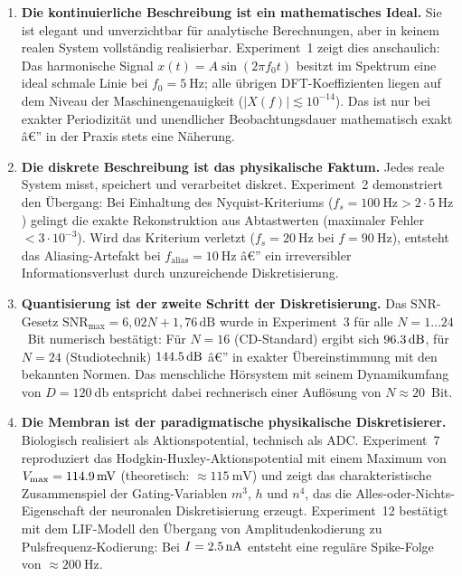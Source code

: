 ﻿\documentclass[12pt,a4paper,titlepage]{report}
\begin{document}
\begin{enumerate}[leftmargin=2em, label=\textbf{\arabic{enumi}.}]

	\item \textbf{Die kontinuierliche Beschreibung ist ein mathematisches Ideal.}
		Sie ist elegant und unverzichtbar für analytische Berechnungen,
		aber in keinem realen System vollständig realisierbar.
		Experiment~1 zeigt dies anschaulich: Das harmonische Signal
		$x(t)=A\sin(2\pi f_0 t)$ besitzt im Spektrum eine ideal schmale
		Linie bei $f_0=\SI{5}{\hertz}$; alle übrigen DFT-Koeffizienten
		liegen auf dem Niveau der Maschinengenauigkeit
		($|X(f)| \lesssim 10^{-14}$).
		Das ist nur bei exakter Periodizität und unendlicher Beobachtungsdauer
		mathematisch exakt â€” in der Praxis stets eine Näherung.

	\item \textbf{Die diskrete Beschreibung ist das physikalische Faktum.}
		Jedes reale System misst, speichert und verarbeitet diskret.
		Experiment~2 demonstriert den Übergang: Bei Einhaltung des
		Nyquist-Kriteriums ($f_s=\SI{100}{\hertz} > 2\cdot\SI{5}{\hertz}$)
		gelingt die exakte Rekonstruktion aus Abtastwerten
		(maximaler Fehler $< 3\cdot10^{-3}$).
		Wird das Kriterium verletzt ($f_s=\SI{20}{\hertz}$ bei
		$f=\SI{90}{\hertz}$), entsteht das Aliasing-Artefakt bei
		$f_{\mathrm{alias}}=\SI{10}{\hertz}$ â€” ein irreversibler
		Informationsverlust durch unzureichende Diskretisierung.

	\item \textbf{Quantisierung ist der zweite Schritt der Diskretisierung.}
		Das $\mathrm{SNR}$-Gesetz $\mathrm{SNR}_{\max}=6{,}02N+1{,}76\,\mathrm{dB}$
		wurde in Experiment~3 für alle $N=1\ldots24$~Bit numerisch bestätigt:
		Für $N=16$ (CD-Standard) ergibt sich $\SI{96{,}3}{\decibel}$,
		für $N=24$ (Studiotechnik) $\SI{144{,}5}{\decibel}$ â€”
		in exakter Übereinstimmung mit den bekannten Normen.
		Das menschliche Hörsystem mit seinem Dynamikumfang von
		$D=\SI{120}{\decibel}$ entspricht dabei rechnerisch
		einer Auflösung von $N\approx20$~Bit.

	\item \textbf{Die Membran ist der paradigmatische physikalische Diskretisierer.}
		Biologisch realisiert als Aktionspotential, technisch als ADC.
		Experiment~7 reproduziert das Hodgkin-Huxley-Aktionspotential
		mit einem Maximum von $V_{\max}=\SI{114{,}9}{\milli\volt}$
		(theoretisch: $\approx\SI{115}{\milli\volt}$) und zeigt das
		charakteristische Zusammenspiel der Gating-Variablen $m^3$, $h$ und $n^4$,
		das die Alles-oder-Nichts-Eigenschaft der neuronalen Diskretisierung erzeugt.
		Experiment~12 bestätigt mit dem LIF-Modell den Übergang von
		Amplitudenkodierung zu Pulsfrequenz-Kodierung:
		Bei $I=\SI{2{,}5}{\nano\ampere}$ entsteht eine reguläre
		Spike-Folge von $\approx\SI{200}{\hertz}$.


\end{enumerate}
\end{document}
